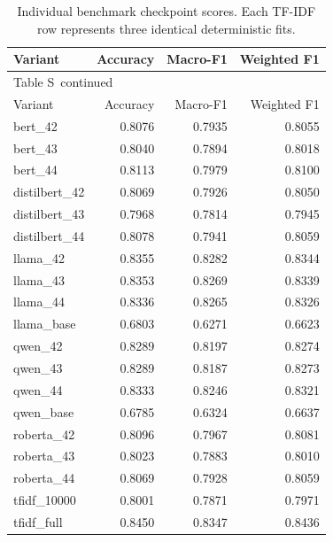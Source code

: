 \documentclass[10pt,a4paper]{article}
\renewcommand{\thetable}{S\arabic{table}}
\begin{document}
{\small
\setlength{\tabcolsep}{4pt}
\begin{longtable}{@{}lrrr@{}}
\caption{Individual benchmark checkpoint scores. Each TF-IDF row represents three identical deterministic fits.}\label{sup:seeds-legacy}\\
\toprule
Variant & Accuracy & Macro-F1 & Weighted F1 \\
\midrule\endfirsthead
\multicolumn{4}{l}{\small Table \thetable\ continued}\\
\toprule
Variant & Accuracy & Macro-F1 & Weighted F1 \\
\midrule\endhead
\bottomrule\endfoot
bert\_42 & 0.8076 & 0.7935 & 0.8055 \\
bert\_43 & 0.8040 & 0.7894 & 0.8018 \\
bert\_44 & 0.8113 & 0.7979 & 0.8100 \\
distilbert\_42 & 0.8069 & 0.7926 & 0.8050 \\
distilbert\_43 & 0.7968 & 0.7814 & 0.7945 \\
distilbert\_44 & 0.8078 & 0.7941 & 0.8059 \\
llama\_42 & 0.8355 & 0.8282 & 0.8344 \\
llama\_43 & 0.8353 & 0.8269 & 0.8339 \\
llama\_44 & 0.8336 & 0.8265 & 0.8326 \\
llama\_base & 0.6803 & 0.6271 & 0.6623 \\
qwen\_42 & 0.8289 & 0.8197 & 0.8274 \\
qwen\_43 & 0.8289 & 0.8187 & 0.8273 \\
qwen\_44 & 0.8333 & 0.8246 & 0.8321 \\
qwen\_base & 0.6785 & 0.6324 & 0.6637 \\
roberta\_42 & 0.8096 & 0.7967 & 0.8081 \\
roberta\_43 & 0.8023 & 0.7883 & 0.8010 \\
roberta\_44 & 0.8069 & 0.7928 & 0.8059 \\
tfidf\_10000 & 0.8001 & 0.7871 & 0.7971 \\
tfidf\_full & 0.8450 & 0.8347 & 0.8436 \\
\end{longtable}
}
\end{document}
